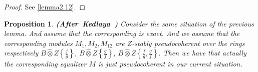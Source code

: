 \documentclass[12pt]{amsart}
\newtheorem{proposition}[theorem]{Proposition}
\theoremstyle{definition}
\numberwithin{equation}{section}
\begin{document}
\begin{proof}
See \cref{lemma2.12}. 






 	
\end{proof}






\begin{proposition} \mbox{\bf{(After Kedlaya \cite[Lemma 1.9.11]{Ked2})}}
Consider the same situation of the previous lemma. And assume that the corresponding \cite[1.6.15.1]{Ked2} is exact. And we assume that the corresponding modules $M_1,M_2,M_{12}$ are $Z$-stably pseudocoherent over the rings respectively $B\widehat{\otimes}Z\left\{\frac{f}{g}\right\}$, $B\widehat{\otimes}Z\left\{\frac{g}{f}\right\}$, $B\widehat{\otimes}Z\left\{\frac{f}{g},\frac{g}{f}\right\}$. Then we have that actually the corresponding equalizer $M$ is just pseudocoherent in our current situation.	
\end{proposition}
\end{document}
